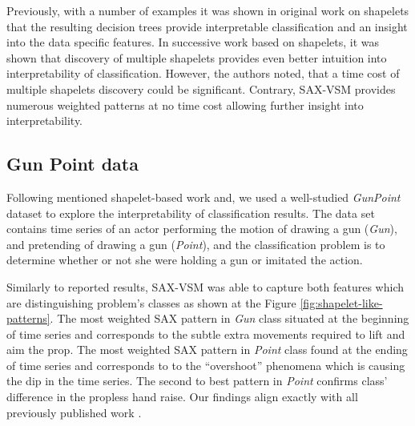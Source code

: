 \documentclass{llncs}
\begin{document}
Previously, with a number of examples it was shown in original work on shapelets \cite{shapelet}
that the resulting decision trees provide interpretable classification and an insight into the data
specific features. In successive work \cite{bagnal} based on shapelets, it was shown that
discovery of multiple shapelets provides even better intuition into interpretability of
classification. However, the authors noted, that a time cost of multiple shapelets discovery
could be significant. Contrary, SAX-VSM provides numerous weighted patterns at no time cost
allowing further insight into interpretability.

\subsection{Gun Point data}
Following mentioned shapelet-based work \cite{shapelet} and\cite{bagnal}, we used a well-studied
\textit{GunPoint} dataset to explore the interpretability of classification results.
The data set contains time series of an actor performing the motion of drawing a gun
(\textit{Gun}), and pretending of drawing a gun (\textit{Point}), and the classification problem is
to determine whether or not she were holding a gun or imitated the action.

Similarly to reported results, SAX-VSM was able to capture both features which are distinguishing
problem's classes as shown at the Figure \ref{fig:shapelet-like-patterns}. The most weighted SAX
pattern in \textit{Gun} class situated at the beginning of time series and corresponds to the subtle
extra movements required to lift and aim the prop. 
The most weighted SAX pattern in \textit{Point} class found at the ending of time series and
corresponds to to the ``overshoot'' phenomena which is causing the dip in the time
series. 
The second to best pattern in \textit{Point} confirms class' difference in the propless hand
raise. 
Our findings align exactly with all previously published work \cite{shapelet} \cite{bagnal}.
\end{document}
